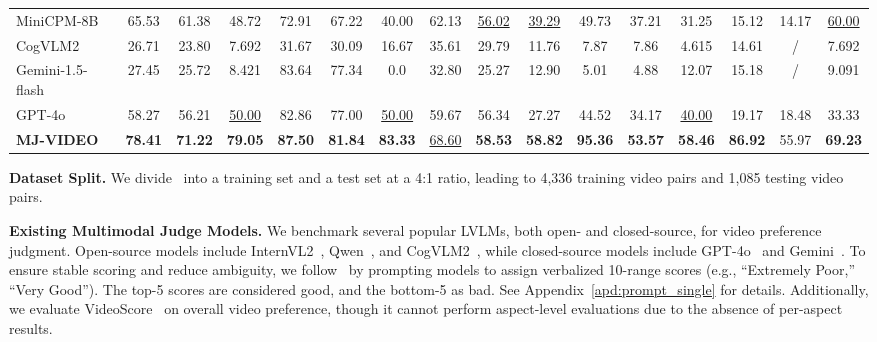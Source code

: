 \begin{table*}[htbp]
{\begin{tabular}{l|ccc|ccc|ccc|ccc|ccc}
MiniCPM-8B & 65.53 & 61.38 & 48.72 & 72.91 & 67.22 & 40.00 & 62.13 & \underline{56.02} & \underline{39.29} & 49.73 & 37.21 & 31.25 & 15.12 & 14.17 & \underline{60.00}\\
CogVLM2 & 26.71 & 23.80 & 7.692 & 31.67 & 30.09 & 16.67 & 35.61 & 29.79 & 11.76 & 7.87 & 7.86 & 4.615 & 14.61 & / & 7.692 \\
Gemini-1.5-flash & 27.45 & 25.72 & 8.421 & 83.64 & 77.34 & 0.0 & 32.80 & 25.27 & 12.90 & 5.01 & 4.88 & 12.07 & 15.18 & / & 9.091 \\
GPT-4o & 58.27 & 56.21 & \underline{50.00} & 82.86 & 77.00 & \underline{50.00} & 59.67 & 56.34 & 27.27 & 44.52 & 34.17 & \underline{40.00} & 19.17 & 18.48 & 33.33\\\midrule
\rowcolor{gray!30} \textbf{MJ-VIDEO} & \textbf{78.41} & \textbf{71.22} & \textbf{79.05} & \textbf{87.50} & \textbf{81.84} & \textbf{83.33} & \underline{68.60} & \textbf{58.53} & \textbf{58.82} & \textbf{95.36} & \textbf{53.57} & \textbf{58.46} & \textbf{86.92} & 55.97 & \textbf{69.23} \\
\bottomrule
\end{tabular}}
\label{tab:aspect_evaluation}
\vspace{-1.5em}
\end{table*}

\textbf{Dataset Split.} We divide \datasetname\ into a training set and a test set at a 4:1 ratio, leading to 4,336 training video pairs and 1,085 testing video pairs.

\textbf{Existing Multimodal Judge Models.} 
We benchmark several popular LVLMs, both open- and closed-source, for video preference judgment. Open-source models include InternVL2~\citep{chen2023internvl}, Qwen~\citep{Qwen2VL}, and CogVLM2~\citep{hong2024cogvlm2}, while closed-source models include GPT-4o~\citep{openai2024gpt4technicalreport} and Gemini~\citep{geminiteam2024geminifamilyhighlycapable}. To ensure stable scoring and reduce ambiguity, we follow~\citet{chen2024mjbenchmultimodalrewardmodel} by prompting models to assign verbalized 10-range scores (e.g., “Extremely Poor,” “Very Good”). The top-5 scores are considered good, and the bottom-5 as bad. See Appendix~\ref{apd:prompt_single} for details. Additionally, we evaluate VideoScore~\citep{he2024videoscore} on overall video preference, though it cannot perform aspect-level evaluations due to the absence of per-aspect results.











